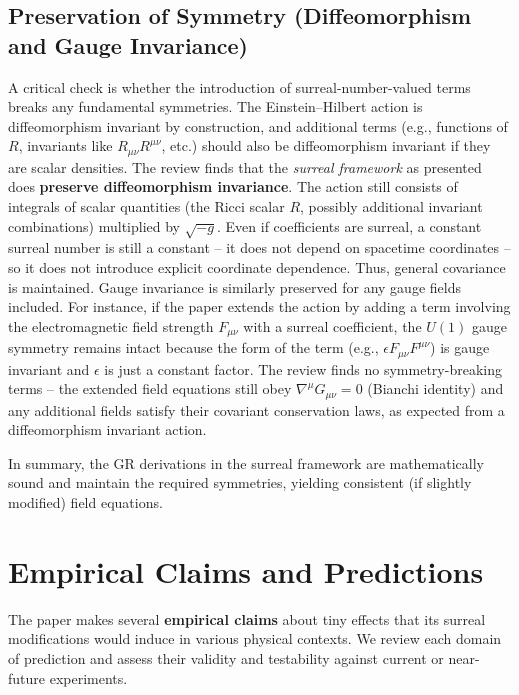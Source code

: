 \documentclass{article}
\begin{document}
\subsection*{Preservation of Symmetry (Diffeomorphism and Gauge Invariance)}
A critical check is whether the introduction of surreal-number-valued terms breaks any fundamental symmetries. The Einstein--Hilbert action is diffeomorphism invariant by construction, and additional terms (e.g., functions of $R$, invariants like $R_{\mu\nu}R^{\mu\nu}$, etc.) should also be diffeomorphism invariant if they are scalar densities. The review finds that the \emph{surreal framework} as presented does \textbf{preserve diffeomorphism invariance}. The action still consists of integrals of scalar quantities (the Ricci scalar $R$, possibly additional invariant combinations) multiplied by $\sqrt{-g}$. Even if coefficients are surreal, a constant surreal number is still a constant – it does not depend on spacetime coordinates – so it does not introduce explicit coordinate dependence. Thus, general covariance is maintained. Gauge invariance is similarly preserved for any gauge fields included. For instance, if the paper extends the action by adding a term involving the electromagnetic field strength $F_{\mu\nu}$ with a surreal coefficient, the $U(1)$ gauge symmetry remains intact because the form of the term (e.g., $\epsilon F_{\mu\nu}F^{\mu\nu}$) is gauge invariant and $\epsilon$ is just a constant factor. The review finds no symmetry-breaking terms – the extended field equations still obey $\nabla^\mu G_{\mu\nu} = 0$ (Bianchi identity) and any additional fields satisfy their covariant conservation laws, as expected from a diffeomorphism invariant action.

In summary, the GR derivations in the surreal framework are mathematically sound and maintain the required symmetries, yielding consistent (if slightly modified) field equations.

\section{Empirical Claims and Predictions}

The paper makes several \textbf{empirical claims} about tiny effects that its surreal modifications would induce in various physical contexts. We review each domain of prediction and assess their validity and testability against current or near-future experiments.
\end{document}
